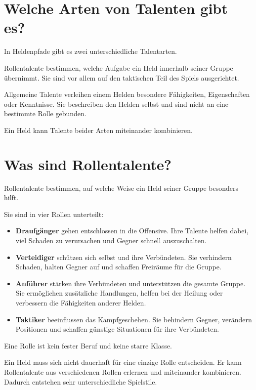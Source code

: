 \section{Welche Arten von Talenten gibt es?}

In Heldenpfade gibt es zwei unterschiedliche Talentarten.

Rollentalente bestimmen, welche Aufgabe ein Held innerhalb seiner Gruppe übernimmt. Sie sind vor allem auf den taktischen Teil des Spiels ausgerichtet.

Allgemeine Talente verleihen einem Helden besondere Fähigkeiten, Eigenschaften oder Kenntnisse. Sie beschreiben den Helden selbst und sind nicht an eine bestimmte Rolle gebunden.

Ein Held kann Talente beider Arten miteinander kombinieren.

\section{Was sind Rollentalente?}

Rollentalente bestimmen, auf welche Weise ein Held seiner Gruppe besonders hilft.

Sie sind in vier Rollen unterteilt:

\begin{itemize}
  \item \textbf{Draufgänger} gehen entschlossen in die Offensive. Ihre Talente helfen dabei, viel Schaden zu verursachen und Gegner schnell auszuschalten.
  \item \textbf{Verteidiger} schützen sich selbst und ihre Verbündeten. Sie verhindern Schaden, halten Gegner auf und schaffen Freiräume für die Gruppe.
  \item \textbf{Anführer} stärken ihre Verbündeten und unterstützen die gesamte Gruppe. Sie ermöglichen zusätzliche Handlungen, helfen bei der Heilung oder verbessern die Fähigkeiten anderer Helden.
  \item \textbf{Taktiker} beeinflussen das Kampfgeschehen. Sie behindern Gegner, verändern Positionen und schaffen günstige Situationen für ihre Verbündeten.
\end{itemize}

Eine Rolle ist kein fester Beruf und keine starre Klasse.

Ein Held muss sich nicht dauerhaft für eine einzige Rolle entscheiden. Er kann Rollentalente aus verschiedenen Rollen erlernen und miteinander kombinieren. Dadurch entstehen sehr unterschiedliche Spielstile.

